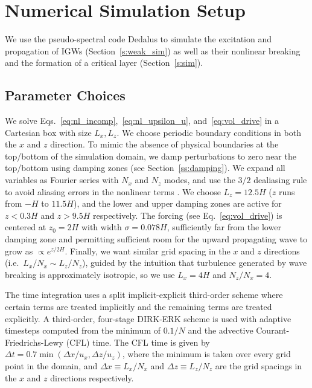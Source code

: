 \documentclass[
        fleqn,
        usenatbib,
    ]{mnras}
\begin{document}
\section{Numerical Simulation Setup}\label{s:numerics}

We use the pseudo-spectral code Dedalus \citep{dedalus,dedalus2} to simulate
the excitation and propagation of IGWs (Section~\ref{s:weak_sim}) as well as
their nonlinear breaking and the formation of a critical layer
(Section~\ref{s:sim}).

\subsection{Parameter Choices}\label{ss:params}

We solve Eqs.~\eqref{eq:nl_incomp},~\eqref{eq:nl_upsilon_u},
and~\eqref{eq:vol_drive} in a Cartesian box with size $L_x, L_z$. We choose
periodic boundary conditions in both the $x$ and $z$ direction. To mimic the
absence of physical boundaries at the top/bottom of the simulation domain, we
damp perturbations to zero near the top/bottom using damping zones (see
Section~\ref{ss:damping}). We expand all variables as Fourier series with $N_x$
and $N_z$ modes, and use the $3/2$ dealiasing rule to avoid aliasing errors in
the nonlinear terms \citep{boyd}. We choose $L_z = 12.5H$ ($z$ runs from $-H$ to
$11.5H$), and the lower and upper damping zones are active for $z < 0.3H$ and $z
> 9.5H$ respectively. The forcing (see Eq.~\eqref{eq:vol_drive}) is centered at
$z_0 = 2H$ with width $\sigma = 0.078H$, sufficiently far from the lower damping
zone and permitting sufficient room for the upward propagating wave to grow as
$\propto e^{z/2H}$. Finally, we want similar grid spacing in the $x$ and $z$
directions (i.e.\ $L_x / N_x \sim L_z /N_z$), guided by the intuition that
turbulence generated by wave breaking is approximately isotropic, so we use $L_x
= 4H$ and $N_z / N_x = 4$.

The time integration uses a split implicit-explicit third-order scheme where
certain terms are treated implicitly and the remaining terms are treated
explicitly. A third-order, four-stage DIRK-ERK scheme \citep{ascher} is used
with adaptive timesteps computed from the minimum of $0.1 / N$
and the advective Courant-Friedrichs-Lewy (CFL) time. The CFL time is given by
$\Delta t = 0.7 \min(\Delta x / u_x,\Delta z / u_{z})$, where the minimum is
taken over every grid point in the domain, and $\Delta x \equiv L_x / N_x$ and
$\Delta z \equiv L_z / N_z$ are the grid spacings in the $x$ and $z$ directions
respectively.
\end{document}
